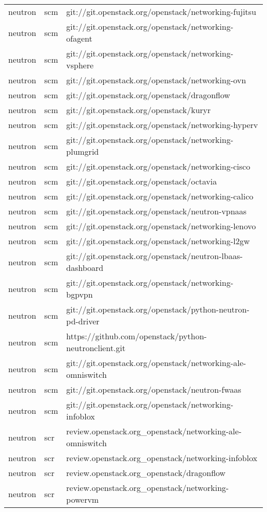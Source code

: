 \begin{center}
\begin{longtable}{|p{4cm}|p{1cm}|p{10cm}|}
neutron&scm&git://git.openstack.org/openstack/networking-fujitsu\\ 
neutron&scm&git://git.openstack.org/openstack/networking-ofagent\\ 
neutron&scm&git://git.openstack.org/openstack/networking-vsphere\\ 
neutron&scm&git://git.openstack.org/openstack/networking-ovn\\ 
neutron&scm&git://git.openstack.org/openstack/dragonflow\\ 
neutron&scm&git://git.openstack.org/openstack/kuryr\\ 
neutron&scm&git://git.openstack.org/openstack/networking-hyperv\\ 
neutron&scm&git://git.openstack.org/openstack/networking-plumgrid\\ 
neutron&scm&git://git.openstack.org/openstack/networking-cisco\\ 
neutron&scm&git://git.openstack.org/openstack/octavia\\ 
neutron&scm&git://git.openstack.org/openstack/networking-calico\\ 
neutron&scm&git://git.openstack.org/openstack/neutron-vpnaas\\ 
neutron&scm&git://git.openstack.org/openstack/networking-lenovo\\ 
neutron&scm&git://git.openstack.org/openstack/networking-l2gw\\ 
neutron&scm&git://git.openstack.org/openstack/neutron-lbaas-dashboard\\ 
neutron&scm&git://git.openstack.org/openstack/networking-bgpvpn\\ 
neutron&scm&git://git.openstack.org/openstack/python-neutron-pd-driver\\ 
neutron&scm&https://github.com/openstack/python-neutronclient.git\\ 
neutron&scm&git://git.openstack.org/openstack/networking-ale-omniswitch\\ 
neutron&scm&git://git.openstack.org/openstack/neutron-fwaas\\ 
neutron&scm&git://git.openstack.org/openstack/networking-infoblox\\ 
neutron&scr&review.openstack.org\_openstack/networking-ale-omniswitch\\ 
neutron&scr&review.openstack.org\_openstack/networking-infoblox\\ 
neutron&scr&review.openstack.org\_openstack/dragonflow\\ 
neutron&scr&review.openstack.org\_openstack/networking-powervm\\ 

\end{longtable}
\end{center}
